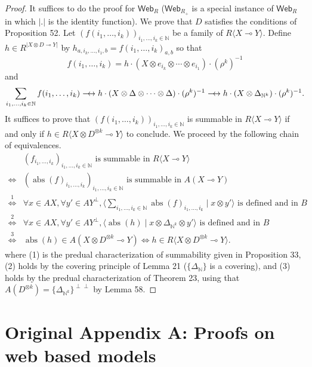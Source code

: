 \documentclass[10pt,a4paper]{article}
\newcommand{\lolli}{\multimap}
\newcommand{\Web}{\mathsf{Web}}
\newcommand{\abs}{\operatorname{abs}}
\newcommand{\dequiv}{\mathrel{\relbar\joinrel\leftrightarrow}}
\newcommand{\scalar}[2]{\langle #1\mid #2\rangle}
\newcommand{\Rmod}[1]{R\langle #1\rangle}
\begin{document}
\begin{proof}
It suffices to do the proof for $\Web_R$ ($\Web_{R_+}$ is a special instance of $\Web_R$ in which $|.|$ is the identity function). We prove that $D$ satisfies the conditions of Proposition 52. Let $(f(i_1,\ldots,i_k))_{i_1,\ldots,i_k\in\mathbb N}$ be a family of $\Rmod{X\lolli Y}$. Define $h\in R^{|X\otimes D\lolli Y|}$ by $h_{a,i_k,\ldots,i_1,b}=f(i_1,\ldots,i_k)_{a,b}$ so that
\[f(i_1,\ldots,i_k)=h\cdot(X\otimes e_{i_k}\otimes\cdots\otimes e_{i_1})\cdot(\rho^k)^{-1}\]
and
\[\sum_{i_1,\ldots,i_k\in\mathbb N}f(i_1,\ldots,i_k)\dequiv h\cdot(X\otimes\Delta\otimes\cdots\otimes\Delta)\cdot(\rho^k)^{-1}\dequiv h\cdot(X\otimes\Delta_{\mathbb N^k})\cdot(\rho^k)^{-1}.\]
It suffices to prove that $(f(i_1,\ldots,i_k))_{i_1,\ldots,i_k\in\mathbb N}$ is summable in $\Rmod{X\lolli Y}$ if and only if $h\in\Rmod{X\otimes D^{\otimes k}\lolli Y}$ to conclude. We proceed by the following chain of equivalences.
\begin{align*}
&(f_{i_1,\ldots,i_k})_{i_1,\ldots,i_k\in\mathbb N}\text{ is summable in }\Rmod{X\lolli Y}\\
\iff{}&(\abs(f)_{i_1,\ldots,i_k})_{i_1,\ldots,i_k\in\mathbb N}\text{ is summable in }A(X\lolli Y)\\
\mathrel{\stackrel{1}{\iff}}{}&\forall x\in AX,\forall y'\in AY^\perp,\scalar{\sum_{i_1,\ldots,i_k\in\mathbb N}\abs(f)_{i_1,\ldots,i_k}}{x\otimes y'}\text{ is defined and in }B\\
\mathrel{\stackrel{2}{\iff}}{}&\forall x\in AX,\forall y'\in AY^\perp,\scalar{\abs(h)}{x\otimes\Delta_{\mathbb N^k}\otimes y'}\text{ is defined and in }B\\
\mathrel{\stackrel{3}{\iff}}{}&\abs(h)\in A(X\otimes D^{\otimes k}\lolli Y)\iff h\in\Rmod{X\otimes D^{\otimes k}\lolli Y}.
\end{align*}
where (1) is the predual characterization of summability given in Proposition 33, (2) holds by the covering principle of Lemma 21 ($\{\Delta_{\mathbb N}\}$ is a covering), and (3) holds by the predual characterization of Theorem 23, using that $A(D^{\otimes k})=\{\Delta_{\mathbb N^k}\}^{\perp\perp}$ by Lemma 58.
\end{proof}

\section*{Original Appendix A: Proofs on web based models}
\end{document}
